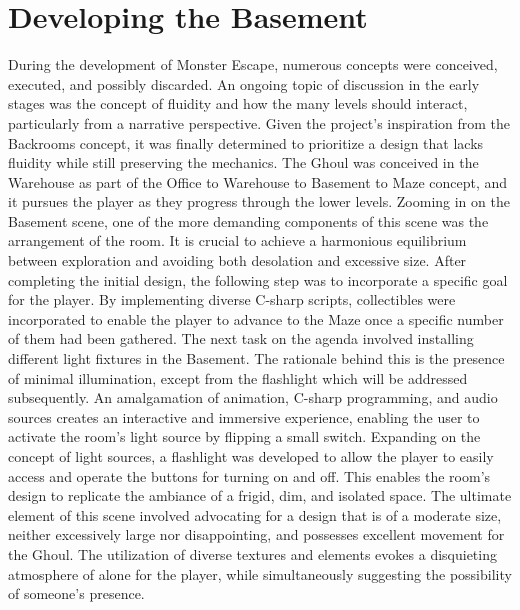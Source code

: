 \documentclass{vgtc}                          %
\begin{document}
\section{Developing the Basement}
During the development of Monster Escape, numerous concepts were conceived, executed, and possibly discarded. An ongoing topic of discussion in the early stages was the concept of fluidity and how the many levels should interact, particularly from a narrative perspective. Given the project's inspiration from the Backrooms concept, it was finally determined to prioritize a design that lacks fluidity while still preserving the mechanics. The Ghoul was conceived in the Warehouse as part of the Office to Warehouse to Basement to Maze concept, and it pursues the player as they progress through the lower levels. Zooming in on the Basement scene, one of the more demanding components of this scene was the arrangement of the room. It is crucial to achieve a harmonious equilibrium between exploration and avoiding both desolation and excessive size. After completing the initial design, the following step was to incorporate a specific goal for the player. By implementing diverse C-sharp scripts, collectibles were incorporated to enable the player to advance to the Maze once a specific number of them had been gathered. The next task on the agenda involved installing different light fixtures in the Basement. The rationale behind this is the presence of minimal illumination, except from the flashlight which will be addressed subsequently. An amalgamation of animation, C-sharp programming, and audio sources creates an interactive and immersive experience, enabling the user to activate the room's light source by flipping a small switch. Expanding on the concept of light sources, a flashlight was developed to allow the player to easily access and operate the buttons for turning on and off. This enables the room's design to replicate the ambiance of a frigid, dim, and isolated space. The ultimate element of this scene involved advocating for a design that is of a moderate size, neither excessively large nor disappointing, and possesses excellent movement for the Ghoul. The utilization of diverse textures and elements evokes a disquieting atmosphere of alone for the player, while simultaneously suggesting the possibility of someone's presence.
\end{document}
